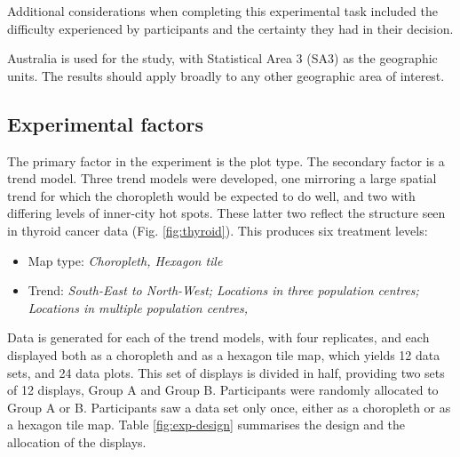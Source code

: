 \documentclass[times, doublespace]{anzsauth}
\begin{document}
Additional considerations when completing this experimental task
included the difficulty experienced by participants and the certainty
they had in their decision.

Australia is used for the study, with Statistical Area 3 (SA3)
\citep{abs2016} as the geographic units. The results
should apply broadly to any other geographic area of interest.

\subsection{Experimental factors}\label{experimental-factors}

The primary factor in the experiment is the plot type. The secondary
factor is a trend model. Three trend models were developed, one
mirroring a large spatial trend for which the choropleth would be
expected to do well, and two with differing levels of inner-city hot
spots. These latter two reflect the structure seen in thyroid cancer
data (Fig. \ref{fig:thyroid}). This
produces six treatment levels:

\begin{itemize}
 \item
  Map type: \emph{Choropleth, Hexagon tile}
\item
  Trend: \emph{South-East to North-West; Locations in three population
  centres; Locations in multiple population centres, }
\end{itemize}

Data is generated for each of the trend models, with four replicates,
and each displayed both as a choropleth and as a hexagon tile map, which
yields 12 data sets, and 24 data plots. This set of displays is divided
in half, providing two sets of 12 displays, Group A and Group B.
Participants were randomly allocated to Group A or B. Participants saw a
data set only once, either as a choropleth or as a hexagon tile map.
Table \ref{fig:exp-design} summarises the design and the allocation of
the displays.
\end{document}
